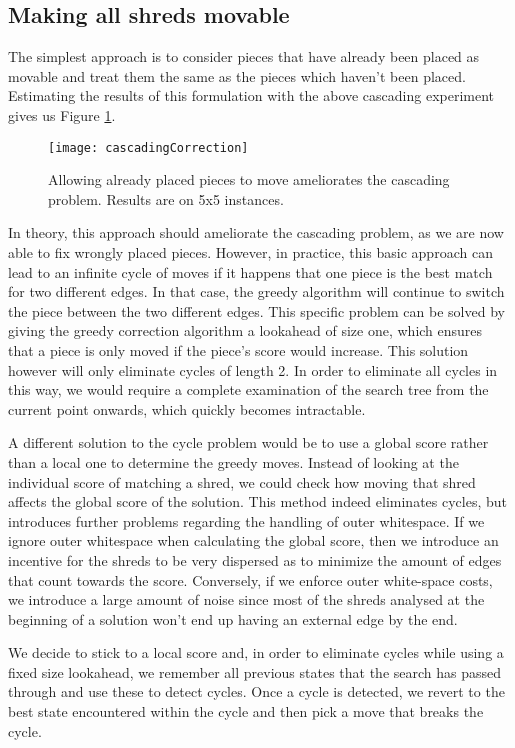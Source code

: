\newpage
\subsection{Making all shreds movable}
The simplest approach is to consider pieces that have already been placed as movable and treat them the same as the pieces which haven't been placed. Estimating the results of this formulation with the above cascading experiment gives us Figure \ref{fig:cascCorr}.

\begin{figure}[h]
  \centering
  \texttt{[image: cascadingCorrection]}
  \caption{Allowing already placed pieces to move ameliorates the cascading problem. Results are on 5x5 instances.}
  \label{fig:cascCorr}
\end{figure}

In theory, this approach should ameliorate the cascading problem, as we are now able to fix wrongly placed pieces. However, in practice, this basic approach can lead to an infinite cycle of moves if it happens that one piece is the best match for two different edges. In that case, the greedy algorithm will continue to switch the piece between the two different edges. This specific problem can be solved by giving the greedy correction algorithm a lookahead of size one, which ensures that a piece is only moved if the piece's score would increase. This solution however will only eliminate cycles of length 2. In order to eliminate all cycles in this way, we would require a complete examination of the search tree from the current point onwards, which quickly becomes intractable.

A different solution to the cycle problem would be to use a global score rather than a local one to determine the greedy moves. Instead of looking at the individual score of matching a shred, we could check how moving that shred affects the global score of the solution. This method indeed eliminates cycles, but introduces further problems regarding the handling of outer whitespace. If we ignore outer whitespace when calculating the global score, then we introduce an incentive for the shreds to be very dispersed as to minimize the amount of edges that count towards the score. Conversely, if we enforce outer white-space costs, we introduce a large amount of noise since most of the shreds analysed at the beginning of a solution won't end up having an external edge by the end.

We decide to stick to a local score and, in order to eliminate cycles while using a fixed size lookahead, we remember all previous states that the search has passed through and use these to detect cycles. Once a cycle is detected, we revert to the best state encountered within the cycle and then pick a move that breaks the cycle.

